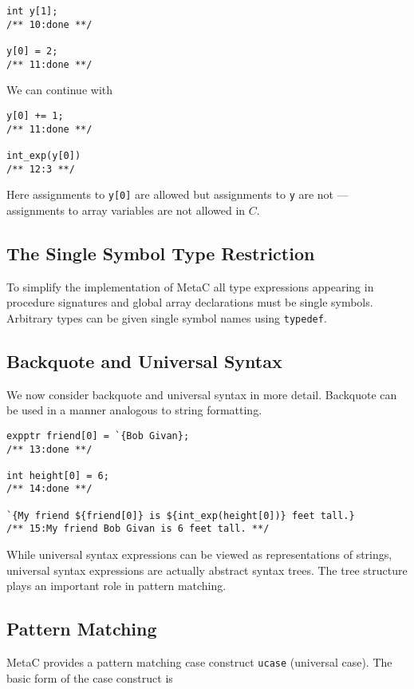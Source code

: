 \documentclass{article}
\begin{document}
\begin{verbatim}
int y[1];
/** 10:done **/

y[0] = 2;
/** 11:done **/
\end{verbatim}

We can continue with

\begin{verbatim}
y[0] += 1;
/** 11:done **/

int_exp(y[0])
/** 12:3 **/
\end{verbatim}

Here assignments to {\tt y[0]} are allowed but assignments to {\tt y} are not --- assignments to array variables
are not allowed in $C$.

\subsection{The Single Symbol Type Restriction}

To simplify the implementation of MetaC all type expressions appearing in procedure signatures and global array declarations must be single symbols.
Arbitrary types can be given single symbol names using {\tt typedef}.

\subsection{Backquote and Universal Syntax}

We now consider backquote and universal syntax in more detail.  Backquote can be used in a manner analogous to string formatting.

\begin{verbatim}
expptr friend[0] = `{Bob Givan};
/** 13:done **/

int height[0] = 6;
/** 14:done **/

`{My friend ${friend[0]} is ${int_exp(height[0])} feet tall.}
/** 15:My friend Bob Givan is 6 feet tall. **/
\end{verbatim}

While universal syntax expressions can be viewed as representations of strings, universal syntax
expressions are actually abstract syntax trees. The tree structure
plays an important role in pattern matching.

\subsection{Pattern Matching}

MetaC provides a pattern matching case construct {\tt ucase} (universal case).
The basic form of the case construct is
\end{document}
